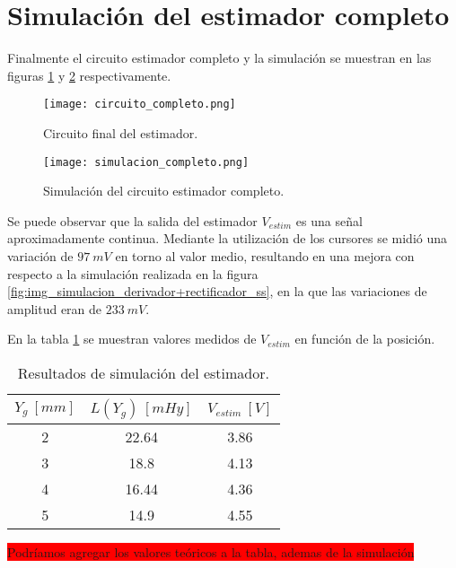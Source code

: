 \section{Simulación del estimador completo}

Finalmente el circuito estimador completo y la simulación se muestran en las figuras \ref{fig:img_circuito_final_del_estimador} y \ref{fig:img_simulacion_completo} respectivamente.

\begin{figure}[H]
\centering
\texttt{[image: circuito\_completo.png]}
\caption{Circuito final del estimador.}
\label{fig:img_circuito_final_del_estimador}
\end{figure}

\begin{figure}[H]
	\centering
	\texttt{[image: simulacion\_completo.png]}
	\caption{Simulación del circuito estimador completo.}
	\label{fig:img_simulacion_completo}
\end{figure}

Se puede observar que la salida del estimador $V_{estim}$ es una señal aproximadamente continua. Mediante la utilización de los cursores se midió una variación de $97\:mV$ en torno al valor medio, resultando en una mejora con respecto a la simulación realizada en la figura \ref{fig:img_simulacion_derivador+rectificador_ss}, en la que las variaciones de amplitud eran de $233\:mV$.

En la tabla \ref{tab_Resultados_de_simulación_del_estimador} se muestran valores medidos de $V_{estim}$ en función de la posición.


\begin{table}[H]
	\begin{center}
		\begin{tabular}{| c | c | c |}
			\hline
			$Y_g\:[mm]$ & $L(Y_g)\:[mHy]$ & $V_{estim}\:[V]$ \\ \hline 
			2 & 22.64 & 3.86 \\ \hline 
			3 & 18.8 & 4.13 \\ \hline 
			4 & 16.44 & 4.36 \\ \hline 
			5 & 14.9 & 4.55 \\ \hline 
		\end{tabular}
		\caption{Resultados de simulación del estimador.}
		\label{tab_Resultados_de_simulación_del_estimador}
	\end{center}
\end{table}

\colorbox{red}{Podríamos agregar los valores teóricos a la tabla, ademas de la simulación}

